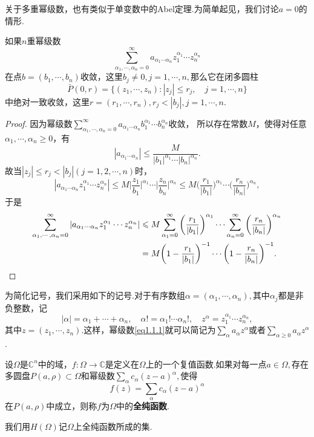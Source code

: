 关于多重幂级数，也有类似于单变数中的Abel定理.为简单起见，我们讨论$a=0$的情形.
\begin{prop}\label{prop1.1.1}
	如果$n$重幂级数
	\begin{equation}\label{eq1.1.1}
		\sum_{\alpha_1,\cdots,\alpha_n=0}^\infty a_{\alpha_1\cdots\alpha_n}z_1^{\alpha_1}\cdots z_n^{\alpha_n}
	\end{equation}
	在点$b=(b_1,\cdots,b_n)$收敛，这里$b_j\neq0,j=1,\cdots,n,$那么它在闭多圆柱
	\[\bar{P}(0,r)=\{(z_1,\cdots,z_n)\colon |z_j|\le r_j,\quad j=1,\cdots,n\}\]
	中绝对一致收敛，这里$r=(r_1,\cdots,r_n),r_j<|b_j|,j=1,\cdots,n$.
\end{prop}
\begin{proof}
	因为幂级数$\sum\limits_{\alpha_1,\cdots,\alpha_n=0}^\infty a_{\alpha_1\cdots\alpha_n} b_1^{\alpha_1}\cdots b_n^{\alpha_n}$收敛，
	所以存在常数$M$，使得对任意$\alpha_1,\cdots,\alpha_n\ge0$，有
	\[|a_{\alpha_1\cdots\alpha_n}|\le\frac{M}{|b_1|^{\alpha_1}\cdots|b_n|^{\alpha_n}}.\]
	故当$|z_j|\le r_j<|b_j|(j=1,2,\cdots,n)$时，
	\[|a_{\alpha_1\cdots\alpha_n}z_1^{\alpha_1}\cdots z_n^{\alpha_n}|\le M\bigg| \frac{z_1}{b_1}\bigg|^{\alpha_1}\cdots\bigg| \frac{z_n}{b_n}\bigg|^{\alpha_n}\le M\bigg(\frac{r_1}{|b_1|}\bigg)^{\alpha_1}\cdots\bigg(\frac{r_n}{|b_n|}\bigg)^{\alpha_n},\]
	于是
	\begin{align*}
		\sum_{\alpha_1,\cdots,\alpha_n=0}^\infty |a_{\alpha_1\cdots\alpha_n} z_1^{\alpha_1}\cdots z_n^{\alpha_n}|
		&\le M\sum_{\alpha_1=0}^\infty \bigg(\frac{r_1}{|b_1|}\bigg)^{\alpha_1}\cdots\sum_{\alpha_n=0}^\infty\bigg(\frac{r_n}{|b_n|}\bigg)^{\alpha_n}\\
		&=M\bigg(1-\frac{r_1}{|b_1|}\bigg)^{-1}\cdots\bigg(1-\frac{r_n}{|b_n|}\bigg)^{-1}.\qedhere
	\end{align*}
\end{proof}
为简化记号，我们采用如下的记号.对于有序数组$\alpha=(\alpha_1,\cdots,\alpha_n),$其中$\alpha_j$都是非负整数，记
\[|\alpha|=\alpha_1+\cdots+\alpha_n,\quad \alpha!=\alpha_1!\cdots\alpha_n!,\quad z^\alpha=z_1^{\alpha_1}\cdots z_n^{\alpha_n},\]
其中$z=(z_1,\cdots,z_n)$.这样，幂级数\eqref{eq1.1.1}就可以简记为$\sum\limits_\alpha a_\alpha z^\alpha$或者$\sum\limits_{\alpha\ge0}a_\alpha z^\alpha$.
\begin{definition}\label{def1.1.2}
	设$\Omega$是$\mathbb{C}^n$中的域，$f\colon\Omega\to\mathbb{C}$是定义在$\Omega$上的一个复值函数.如果对每一点$a\in\Omega,$存在多圆盘$P(a,\rho)\subset\Omega$和幂级数$\sum\limits_\alpha c_\alpha(z-a)^\alpha,$使得
	\begin{equation}\label{eq1.1.2}
		f(z)=\sum_\alpha c_\alpha (z-a)^\alpha
	\end{equation}
	在$P(a,\rho)$中成立，则称$f$为$\Omega$中的\textbf{全纯函数}.
	
	我们用$H(\Omega)$记$\Omega$上全纯函数所成的集.
\end{definition}
